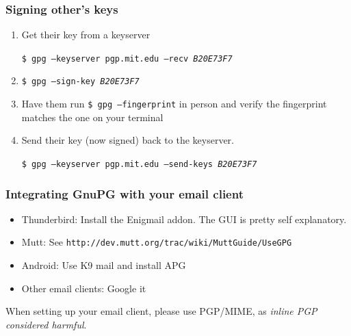 \documentclass{beamer}
\begin{document}
\begin{frame}
    \frametitle{Signing other's keys}
    \begin{enumerate}[<+->]
        \item Get their key from a keyserver\par
            \texttt{\small \$ gpg --keyserver pgp.mit.edu --recv \emph{B20E73F7}}
        \item \texttt{\$ gpg --sign-key \emph{B20E73F7}}
        \item Have them run \texttt{\$ gpg --fingerprint} in person and verify
            the fingerprint matches the one on your terminal
        \item Send their key (now signed) back to the keyserver.\par
            \texttt{\small \$ gpg --keyserver pgp.mit.edu --send-keys \emph{B20E73F7}}
    \end{enumerate}
\end{frame}

\begin{frame}
    \frametitle{Integrating GnuPG with your email client}
    \begin{itemize}
        \item Thunderbird: Install the Enigmail addon. The GUI is pretty self
            explanatory.
        \item Mutt: See \texttt{http://dev.mutt.org/trac/wiki/MuttGuide/UseGPG}
        \item Android: Use K9 mail and install APG
        \item Other email clients: Google it
    \end{itemize}
    When setting up your email client, please use PGP/MIME, as
    \emph{inline PGP considered harmful}.
\end{frame}
\end{document}
